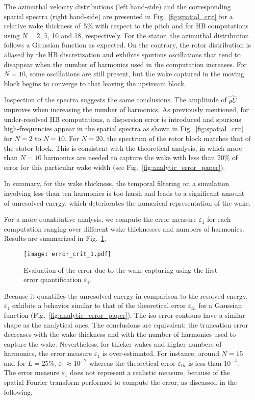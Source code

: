 The azimuthal velocity distributions (left hand-side) and the corresponding spatial
spectra (right hand-side)
are presented in Fig.~\ref{fig:spatial_crit} 
for a relative wake thickness of~5\% with respect to the pitch 
and for HB computations using $N=2$, 5, 10 and 18, respectively.
For the stator, the azimuthal distribution follows a 
Gaussian function as expected. On the contrary, 
the rotor distribution is aliased by the HB discretization 
and exhibits spurious oscillations that tend to disappear
when the number of harmonics used in the computation 
increases.
For $N=10$, some oscillations are still present, 
but the wake captured in the moving block begins to 
converge to that leaving the upstream block.

Inspection of the spectra suggests the same conclusions.
The amplitude of $\widehat{\rho U}$ 
improves when increasing the number of harmonics.
As previously mentioned, for under-resolved HB computations,
a dispersion error is introduced and spurious high-frequencies appear 
in the spatial spectra as shown in Fig.~\ref{fig:spatial_crit}
for $N=2$ to $N=10$.
For $N=20$, the spectrum of the rotor 
block matches that of the stator block.
This is consistent with the theoretical analysis, in which more than 
$N=10$ harmonics are needed to capture the wake with less than $20\%$ 
of error for this particular
wake width (see Fig.~\ref{fig:analytic_error_paper}).

In summary, for this wake thickness, the temporal filtering 
on a simulation involving less than ten harmonics is too harsh and leads 
to a significant amount of unresolved energy, 
which deteriorates the numerical representation
of the wake.

For a more quantitative analysis, we compute the error measure
$\varepsilon_1$ for each computation ranging over different 
wake thicknesses and numbers of harmonics. 
Results are summarized in Fig.~\ref{fig:crit_1_3d}.
\begin{figure}[htp]
    \centering\texttt{[image: error\_crit\_1.pdf]}
  \caption{Evaluation of the error due to the wake 
  capturing using the first error quantification $\varepsilon_1$.}
  \label{fig:crit_1_3d}
\end{figure}
Because it quantifies the unresolved energy in 
comparison to the resolved energy, $\varepsilon_1$ 
exhibits a behavior similar to that of 
the theoretical error $\varepsilon_{th}$ for a Gaussian function 
(Fig.~\ref{fig:analytic_error_paper}).
The iso-error contours have a similar shape 
as the analytical ones. 
The conclusions are equivalent: the truncation error decreases with 
the wake thickness and with the number of harmonics used to capture the wake.
Nevertheless, for thicker wakes and higher numbers of harmonics, 
the error measure $\varepsilon_1$ is over-estimated. 
For instance, around $N=15$ and for $L=25\%$,
$\varepsilon_1 \approx 10^{-2}$ whereas the theoretical error $\varepsilon_{th}$
is less than $10^{-4}$. The error 
measure $\varepsilon_1$ does not represent a 
realistic measure, because of the spatial 
Fourier transform performed to compute 
the error, as discussed in the following.


